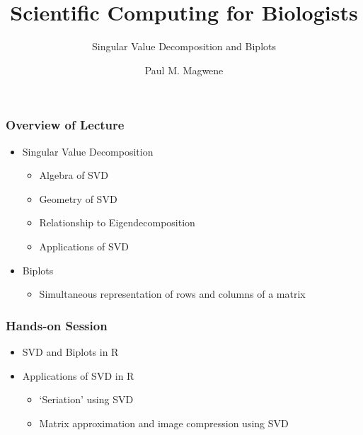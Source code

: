 \documentclass{beamer}
\title{Scientific Computing for Biologists}
\subtitle{Singular Value Decomposition and Biplots}
\author{Paul M. Magwene}
\date{}
\begin{document}
\begin{frame}
\titlepage
\end{frame}

\begin{frame}
  \frametitle{Overview of Lecture}
  
\begin{itemize}
		\item Singular Value Decomposition
		\begin{itemize}
			\item Algebra of SVD
			\item Geometry of SVD
			\item Relationship to Eigendecomposition
			\item Applications of SVD			
		\end{itemize}		
		\item Biplots
		\begin{itemize}
			\item Simultaneous representation of rows and columns of a matrix
		\end{itemize}			
\end{itemize}

\end{frame}

\begin{frame}
  \frametitle{Hands-on Session}
\begin{itemize}
    \item SVD and Biplots in R
    \item Applications of SVD in R
    		\begin{itemize}
    		\item `Seriation' using SVD
			  \item Matrix approximation and image compression using SVD
		\end{itemize}
\end{itemize} 


\end{frame}		
\end{document}
